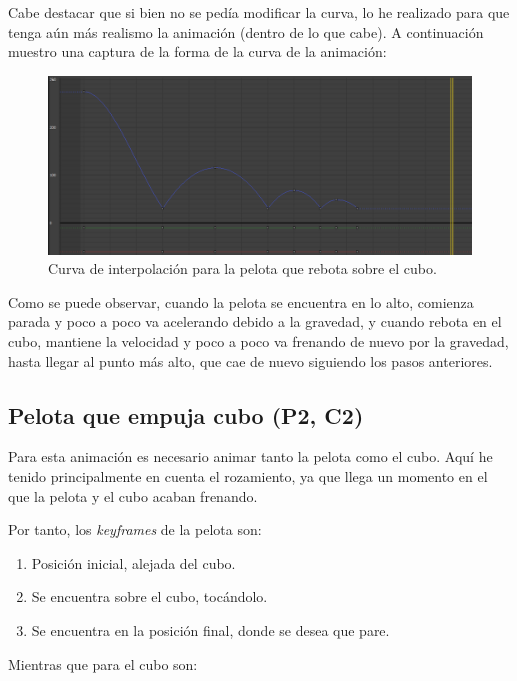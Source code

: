 \documentclass{article}
\begin{document}
Cabe destacar que si bien no se pedía modificar la curva, lo he realizado para que tenga aún más realismo la animación (dentro de lo que cabe). A continuación muestro una captura de la forma de la curva de la animación:


\begin{figure}[H]
    \centering
    \includegraphics[width=\textwidth]{imagenes/curva_p1.png}
    \caption{Curva de interpolación para la pelota que rebota sobre el cubo.}
\end{figure}


Como se puede observar, cuando la pelota se encuentra en lo alto, comienza parada y poco a poco va acelerando debido a la gravedad, y cuando rebota en el cubo, mantiene la velocidad y poco a poco va frenando de nuevo por la gravedad, hasta llegar al punto más alto, que cae de nuevo siguiendo los pasos anteriores.

\subsection{Pelota que empuja cubo (P2, C2)}

Para esta animación es necesario animar tanto la pelota como el cubo. Aquí he tenido principalmente en cuenta el rozamiento, ya que llega un momento en el que la pelota y el cubo acaban frenando.

\bigskip

Por tanto, los \textit{keyframes} de la pelota son:

\begin{enumerate}
    \item Posición inicial, alejada del cubo.
    \item Se encuentra sobre el cubo, tocándolo.
    \item Se encuentra en la posición final, donde se desea que pare.
\end{enumerate}

Mientras que para el cubo son:
\end{document}
